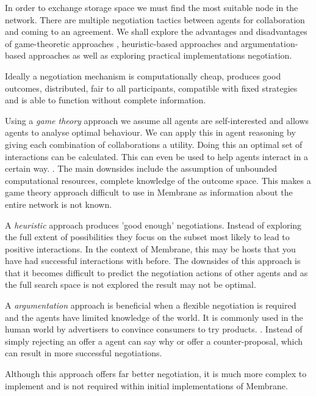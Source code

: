 \documentclass[11pt, a4paper, twocolumn, twoside]{report}
\begin{document}
In order to exchange storage space we must find the most suitable node in the network. There are multiple negotiation tactics between agents for collaboration and coming to an agreement. \citep{beer1999negotiation} We shall explore the advantages and disadvantages of game-theoretic approaches \citep*{rosenschein1994rules, kraus2001strategic, sandholm2002algorithm}, heuristic-based approaches \citep*{faratin2000automated, fatima2002multi} and argumentation-based approaches \citep*{kraus1998reaching, jennings1998argumentation} as well as exploring practical implementations negotiation.

Ideally a negotiation mechanism is computationally cheap, produces good outcomes, distributed, fair to all participants, compatible with fixed strategies and is able to function without complete information. \citep{rahwan2005interest}

Using a \emph{game theory} approach we assume all agents are self-interested and allows agents to analyse optimal behaviour. \citep{osborne1994course} We can apply this in agent reasoning by giving each combination of collaborations a utility. Doing this an optimal set of interactions can be calculated. This can even be used to help agents interact in a certain way. \citep{varian1995economic}. The main downsides include the assumption of unbounded computational resources, complete knowledge of the outcome space. \citep{rahwan2005interest} This makes a game theory approach difficult to use in Membrane as information about the entire network is not known.

A \emph{heuristic} approach produces 'good enough' negotiations. Instead of exploring the full extent of possibilities they focus on the subset most likely to lead to positive interactions. In the context of Membrane, this may be hosts that you have had successful interactions with before. The downsides of this approach is that it becomes difficult to predict the negotiation actions of other agents and as the full search space is not explored the result may not be optimal. \citep{jennings2001automated}

A \emph{argumentation} approach is beneficial when a flexible negotiation is required and the agents have limited knowledge of the world. It is commonly used in the human world by advertisers to convince consumers to try products. \citep{slade2002reasons}. Instead of simply rejecting an offer a agent can say why or offer a counter-proposal, which can result in more successful negotiations.

Although this approach offers far better negotiation, it is much more complex to implement and is not required within initial implementations of Membrane.
\end{document}
